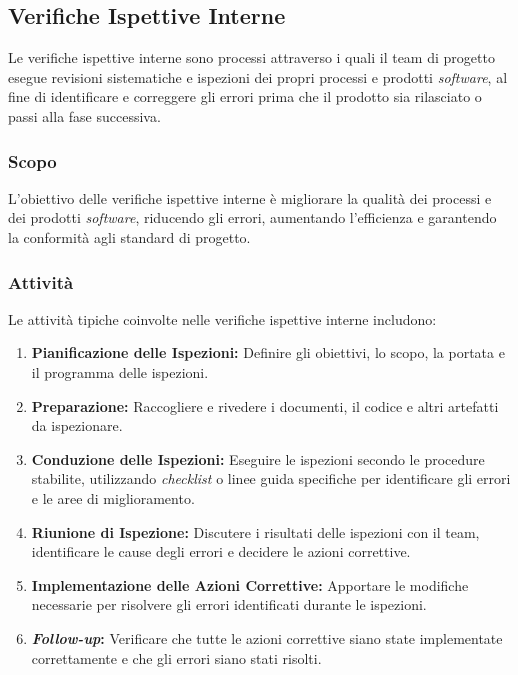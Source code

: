 \subsection{Verifiche Ispettive Interne}

Le verifiche ispettive interne sono processi attraverso i quali il team di
progetto esegue revisioni sistematiche e ispezioni dei propri processi e
prodotti \textit{software}, al fine di identificare e correggere gli errori
prima che il prodotto sia rilasciato o passi alla fase successiva.

\subsubsection{Scopo}
L'obiettivo delle verifiche ispettive interne è migliorare la qualità dei
processi e dei prodotti \textit{software}, riducendo gli errori, aumentando
l'efficienza e garantendo la conformità agli standard di progetto.

\subsubsection{Attività}
Le attività tipiche coinvolte nelle verifiche ispettive interne includono:

\begin{enumerate}
	\item \textbf{Pianificazione delle Ispezioni:} Definire gli obiettivi, lo
	      scopo, la portata e il programma delle ispezioni.
	\item \textbf{Preparazione:} Raccogliere e rivedere i documenti, il codice e
	      altri artefatti da ispezionare.
	\item \textbf{Conduzione delle Ispezioni:} Eseguire le ispezioni secondo le
	      procedure stabilite, utilizzando \textit{checklist} o linee guida
	      specifiche per identificare gli errori e le aree di miglioramento.
	\item \textbf{Riunione di Ispezione:} Discutere i risultati delle ispezioni
	      con il team, identificare le cause degli errori e decidere le azioni
	      correttive.
	\item \textbf{Implementazione delle Azioni Correttive:} Apportare le
	      modifiche necessarie per risolvere gli errori identificati durante le
	      ispezioni.
	\item \textbf{\textit{Follow-up}:} Verificare che tutte le azioni
	      correttive siano state implementate correttamente e che gli errori
	      siano stati risolti.
\end{enumerate}

